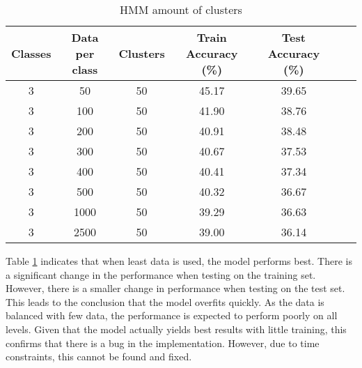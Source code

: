 \begin{table}[h!]
\begin{center}
\begin{tabular}{| c | c | c | c | c | c | c |}
\hline
 {\textbf{Classes}} 	 
 & {\textbf{Data per class}} 					& {\textbf{Clusters}} 
 & {\textbf{Train Accuracy (\%)}} 					& {\textbf{Test Accuracy (\%)}} 
 \\
\hline
3 	 		& 50			& 50			& 45.17		& 39.65		\\
3 	 		& 100 		& 50			& 41.90		& 38.76		\\
3 	 		& 200 		& 50			& 40.91		& 38.48		\\
3 	 		& 300 		& 50			& 40.67		& 37.53		\\
3 	 		& 400 		& 50			& 40.41		& 37.34		\\
3 	 		& 500 		& 50			& 40.32		& 36.67		\\
3 	 		& 1000 		& 50			& 39.29		& 36.63		\\
3 	 		& 2500 		& 50			& 39.00		& 36.14		\\
\hline
\end{tabular}
\caption{HMM amount of clusters}
\label{table:HMMdataset}
\end{center}
\end{table}

Table \ref{table:HMMdataset} indicates that when least data is used, the model performs best. There is a significant change in the performance when testing on the training set. However, there is a smaller change in performance when testing on the test set. This leads to the conclusion that the model overfits quickly. As the data is balanced with few data, the performance is expected to perform poorly on all levels. Given that the model actually yields best results with little training, this confirms that there is a bug in the implementation. However, due to time constraints, this cannot be found and fixed.





